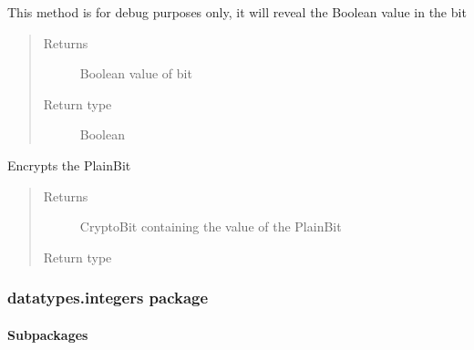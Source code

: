 \documentclass[letterpaper,10pt,english]{sphinxmanual}
\begin{document}
\begin{fulllineitems}
\begin{fulllineitems}
\label{datatypes.bits:datatypes.bits.Bit.PlainBit.debug__printAsBoolean}
This method is for debug purposes only, it will reveal the Boolean value in the bit
\begin{quote}\begin{description}
\item[{Returns}] \leavevmode
Boolean value of bit

\item[{Return type}] \leavevmode
Boolean

\end{description}\end{quote}

\end{fulllineitems}


\begin{fulllineitems}
\label{datatypes.bits:datatypes.bits.Bit.PlainBit.encrypt}
Encrypts the PlainBit
\begin{quote}\begin{description}
\item[{Returns}] \leavevmode
CryptoBit containing the value of the PlainBit

\item[{Return type}] \leavevmode
{\hyperref[datatypes.bits:datatypes.bits.Bit.CryptoBit]{}}

\end{description}\end{quote}

\end{fulllineitems}


\end{fulllineitems}



\subsubsection{datatypes.integers package}
\label{datatypes.integers:datatypes-integers-package}\label{datatypes.integers::doc}

\paragraph{Subpackages}
\label{datatypes.integers:subpackages}
\end{document}
